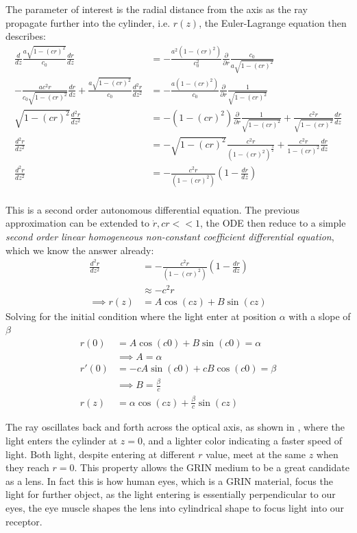 \documentclass[%
 amsmath,amssymb,
aps,
 fleqn,
 notitlepage,
]{revtex4-2}
\begin{document}
The parameter of interest is the radial distance from the axis as the ray propagate further into the cylinder, i.e. $r(z)$, the Euler-Lagrange equation then describes:
\begin{align*}
    \frac{d}{dz} \frac{a\sqrt{1-(cr)^2}}{c_0}\frac{d r}{dz} &= -\frac{a^2(1-(cr)^2)}{c_0^2}\frac{\partial}{\partial r} \frac{c_0}{a\sqrt{1-(cr)^2}}\\
    - \frac{ac^2 r}{c_0\sqrt{1-(cr)^2}}\frac{dr}{dz}+\frac{a\sqrt{1-(cr)^2}}{c_0}\frac{d^2 r}{dz^2} &= -\frac{a(1-(cr)^2)}{c_0}\frac{\partial}{\partial r} \frac{1}{\sqrt{1-(cr)^2}}\\
    \sqrt{1-(cr)^2}\frac{d^2 r}{dz^2} &= -(1-(cr)^2)\frac{\partial}{\partial r} \frac{1}{\sqrt{1-(cr)^2}} + \frac{c^2 r}{\sqrt{1-(cr)^2}}\frac{dr}{dz}\\
    \frac{d^2 r}{dz^2} &= -\sqrt{1-(cr)^2} \frac{c^2r}{(1-(cr)^2)^{\frac{3}{2}}}+ \frac{c^2 r}{{1-(cr)^2}}\frac{dr}{dz}\\
    \frac{d^2 r}{dz^2} &= -\frac{c^2r}{(1-(cr)^2)}\left(1-\frac{dr}{dz}\right)\\
\end{align*}

This is a second order autonomous differential equation. The previous approximation can be extended to $\dot{r},cr<<1$, the ODE then reduce to a simple \textit{second order linear homogeneous non-constant coefficient differential equation}, which we know the answer already:
\begin{align*}
    \frac{d^2 r}{dz^2} &= -\frac{c^2r}{(1-(cr)^2)}\left(1-\frac{dr}{dz}\right)\\
    &\approx -c^2 r\\
    \implies r(z) &= A\cos(cz)+B\sin(cz)
\end{align*}
Solving for the initial condition where the light enter at position $\alpha$ with a slope of $\beta$
\begin{align*}
    r(0) &= A\cos(c0)+B\sin(c0) = \alpha \\
    &\implies A = \alpha\\
    r'(0) &= -cA\sin(c0)+cB\cos(c0) = \beta \\
    &\implies B = \frac{\beta}{c}\\
    r(z) &= \alpha\cos(cz)+\frac{\beta}{c}\sin(cz)
\end{align*}

The ray oscillates back and forth across the optical axis, as shown in , where the light enters the cylinder at $z=0$, and a lighter color indicating a faster speed of light. Both light, despite entering at different $r$ value, meet at the same $z$ when they reach $r = 0$. This property allows the GRIN medium to be a great candidate as a lens. In fact this is how human eyes, which is a GRIN material, focus the light for further object, as the light entering is essentially perpendicular to our eyes, the eye muscle shapes the lens into cylindrical shape to focus light into our receptor.
\end{document}
